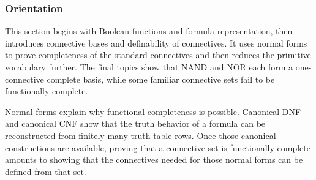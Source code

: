 \subsubsection*{Orientation}

\begin{remark*}
This section begins with Boolean functions and formula representation, then
introduces connective bases and definability of connectives. It uses normal
forms to prove completeness of the standard connectives and then reduces the
primitive vocabulary further. The final topics show that NAND and NOR each form
a one-connective complete basis, while some familiar connective sets fail to be
functionally complete.
\end{remark*}

\begin{remark*}
Normal forms explain why functional completeness is possible. Canonical DNF and
canonical CNF show that the truth behavior of a formula can be reconstructed
from finitely many truth-table rows. Once those canonical constructions are
available, proving that a connective set is functionally complete amounts to
showing that the connectives needed for those normal forms can be defined from
that set.
\end{remark*}
